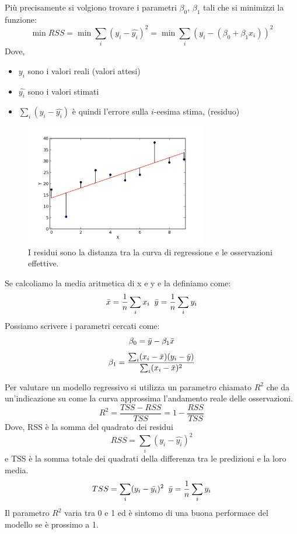 \documentclass[12pt,a4paper,openright,twoside]{report}
\begin{document}
Più precisamente si volgiono trovare i parametri $\beta_{0}$, $\beta_{1}$ tali che si minimizzi la funzione: 
\begin{equation}
    \min{RSS} = \min{\sum_{i}(y_{i} - \hat{y_{i}})^2} = \min{\sum_{i}(y_{i}-(\beta_{0} + \beta_{1}x_{i}))^2}
\end{equation}
Dove, 
\begin{itemize}
    \item $y_{i}$ sono i valori reali (valori attesi)
    \item $\hat{y_{i}}$ sono i valori stimati
    \item $\sum_{i}(y_{i} - \hat{y_{i}})$ è quindi l'errore sulla $i$-eesima stima, (residuo)
\end{itemize}
\begin{center}
\begin{figure}[h]
\centering
\includegraphics[width=300px,keepaspectratio]{residual.png}
\caption{I residui sono la distanza tra la curva di regressione e le osservazioni effettive. }
\end{figure}    
\end{center}
Se calcoliamo la media aritmetica di x e y e la definiamo come:
    \begin{equation}
        \Bar{x} = \frac{1}{n} \sum_{i}x_{i} \;\; \Bar{y} = \frac{1}{n} \sum_{i}y_{i}
    \end{equation}
Possiamo scrivere i parametri cercati come: 
\begin{equation}
    \beta_{0} = \Bar{y} - \beta_{1}\Bar{x}
\end{equation}
\begin{equation}
    \beta_{1} = \frac{\sum_{i}(x_{i}-\Bar{x})(y_{i}-\Bar{y})}{\sum_{i}(x_{i}-\Bar{x})^2}
\end{equation}

Per valutare un modello regressivo si utilizza un parametro chiamato $R^2$ che da un'indicazione su come la curva approssima l'andamento reale delle osservazioni. 
\begin{equation}
    R^2 = \frac{TSS - RSS}{TSS} = 1- \frac{RSS}{TSS}
\end{equation}
Dove, RSS è la somma del quadrato dei residui
\begin{equation}
    RSS = \sum_{i}(y_{i} - \hat{y_{i}})^2
\end{equation}
e TSS è la somma totale dei quadrati della differenza tra le predizioni e la loro media.
\begin{equation}
        TSS = \sum_{i}(y_{i} - \Bar{y_{i}})^2 \; \;
    \Bar{y} = \frac{1}{n} \sum_{i}y_{i}
\end{equation}
Il parametro $R^2$ varia tra 0 e 1 ed è sintomo di una buona performace del modello se è prossimo a 1. 
\end{document}
